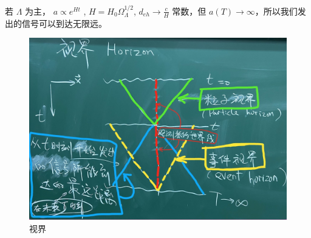 \documentclass[12pt]{ctexart}
\begin{document}
若 $\Lambda$ 为主， $a\propto e^{Ht}$ , $H=H_0 \Omega_\Lambda^{1/2}$,  $d_{eh}\to \frac{c}{H}$ 常数，但 $a(T)\to \infty$，所以我们发出的信号可以到达无限远。 

\begin{figure}[!hbtp]
	\centering
	\includegraphics[width=1.0\linewidth]{horizon.jpg}
	\caption{视界}
\end{figure}
\end{document}
